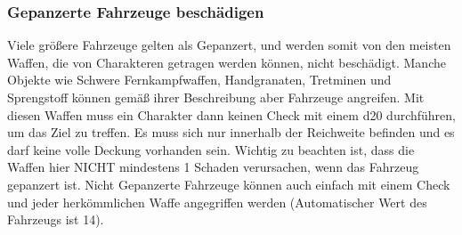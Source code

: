 \subsubsection{Gepanzerte Fahrzeuge beschädigen}
Viele größere Fahrzeuge gelten als Gepanzert, und werden somit von den meisten Waffen, die von Charakteren getragen werden können, nicht beschädigt. Manche Objekte wie Schwere Fernkampfwaffen, Handgranaten, Tretminen und Sprengstoff können gemäß ihrer Beschreibung aber Fahrzeuge angreifen. Mit diesen Waffen muss ein Charakter dann keinen Check mit einem d20 durchführen, um das Ziel zu treffen. Es muss sich nur innerhalb der Reichweite befinden und es darf keine volle Deckung vorhanden sein. Wichtig zu beachten ist, dass die Waffen hier NICHT mindestens 1 Schaden verursachen, wenn das Fahrzeug gepanzert ist.
Nicht Gepanzerte Fahrzeuge können auch einfach mit einem Check und jeder herkömmlichen Waffe angegriffen werden (Automatischer Wert des Fahrzeugs ist 14).


